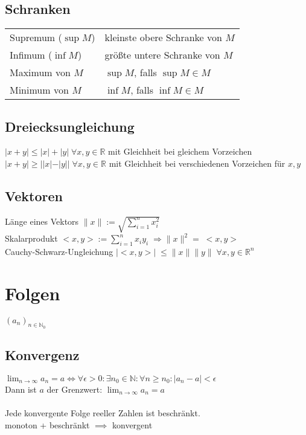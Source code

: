 \documentclass[a4paper,9pt]{extarticle}
\newcommand{\liminfty}[1][n]{\lim_{#1 \to \infty}}
\begin{document}
	\subsection*{Schranken}
	\begin{tabular}{ll}
		Supremum ($\sup M$) & kleinste obere Schranke von $M$ \\
		Infimum ($\inf M$) & größte untere Schranke von $M$ \\
		Maximum von $M$ & $\sup M$, falls $\sup M \in M$ \\
		Minimum von $M$ & $\inf M$, falls $\inf M \in M$ \\
	\end{tabular}
	


	\subsection*{Dreiecksungleichung}

	$|x + y| \le |x| + |y| \; \forall x, y \in \mathbb{R}$ mit Gleichheit bei gleichem Vorzeichen \\
	$|x + y| \ge ||x| - |y|| \; \forall x, y \in \mathbb{R}$ mit Gleichheit bei verschiedenen Vorzeichen für $x,y$


	\subsection*{Vektoren}

	Länge eines Vektors $\|x\| := \sqrt{\sum_{i=1}^n{x_i^2}}$ \\
	Skalarprodukt $<\!x, y\!> := \sum_{i=1}^n{x_i y_i} \; \Rightarrow \|x\|^2 = \; <\!x, y\!>$ \\
	Cauchy-Schwarz-Ungleichung $|<\!x, y\!>| \; \le \|x\| \|y\| \; \forall x, y \in \mathbb{R}^n$

\newpage

\section*{Folgen}

	$(a_n)_{n \in \mathbb{N}_0}$

	\subsection*{Konvergenz}
	
	$ \liminfty{a_n} = a \iff \forall \epsilon > 0: \exists n_0 \in \mathbb{N}: \forall n \ge n_0: |a_n -a| < \epsilon $ \\
	Dann ist $a$ der Grenzwert: $\liminfty{a_n} = a$ \\ \\
	Jede konvergente Folge reeller Zahlen ist beschränkt. \\
	monoton + beschränkt $\implies$ konvergent
	
\end{document}
